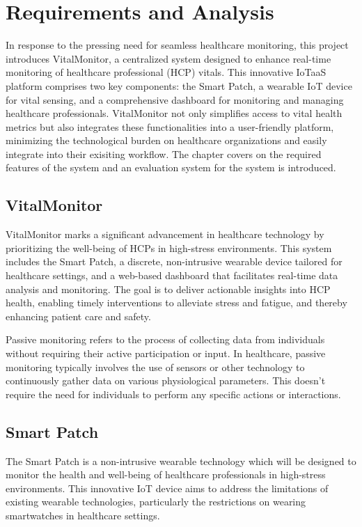 \newpage

\chapter{Requirements and Analysis}
In response to the pressing need for seamless healthcare monitoring, this project introduces VitalMonitor, a centralized system designed to enhance real-time monitoring of healthcare professional (HCP) vitals. This innovative IoTaaS platform comprises two key components: the Smart Patch, a wearable IoT device for vital sensing, and a comprehensive dashboard for monitoring and managing healthcare professionals. VitalMonitor not only simplifies access to vital health metrics but also integrates these functionalities into a user-friendly platform, minimizing the technological burden on healthcare organizations and easily integrate into their exisiting workflow. The chapter covers on the required features of the system and an evaluation system for the system is introduced.

\section{VitalMonitor}

VitalMonitor marks a significant advancement in healthcare technology by prioritizing the well-being of HCPs in high-stress environments. This system includes the Smart Patch, a discrete, non-intrusive wearable device tailored for healthcare settings, and a web-based dashboard that facilitates real-time data analysis and monitoring. The goal is to deliver actionable insights into HCP health, enabling timely interventions to alleviate stress and fatigue, and thereby enhancing patient care and safety.


Passive monitoring refers to the process of collecting data from individuals without requiring their active participation or input. In healthcare, passive monitoring typically involves the use of sensors or other technology to continuously gather data on various physiological parameters. This doesn't require the need for individuals to perform any specific actions or interactions.

\section{Smart Patch}
The Smart Patch is a non-intrusive wearable technology which will be designed to monitor the health and well-being of healthcare professionals in high-stress environments. This innovative IoT device aims to address the limitations of existing wearable technologies, particularly the restrictions on wearing smartwatches in healthcare settings. \\

